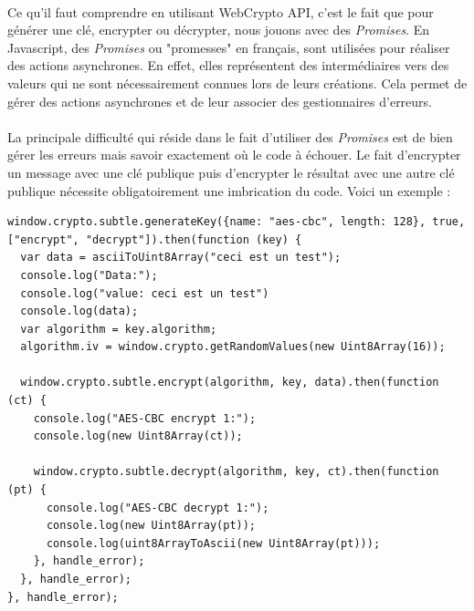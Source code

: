 \documentclass[a4paper,12pt]{report}
\begin{document}
	\paragraph*{}
	Ce qu'il faut comprendre en utilisant WebCrypto API, c'est le fait que pour générer une clé, encrypter ou décrypter, nous jouons avec des \textit{Promises}. En Javascript, des \textit{Promises} ou "promesses" en français, sont utilisées pour réaliser des actions asynchrones. En effet, elles représentent des intermédiaires vers des valeurs qui ne sont nécessairement connues lors de leurs créations. Cela permet de gérer des actions asynchrones et de leur associer des gestionnaires d'erreurs. 
	\paragraph*{}
	La principale difficulté qui réside dans le fait d'utiliser des \textit{Promises} est de bien gérer les erreurs mais savoir exactement où le code à échouer. Le fait d'encrypter un message avec une clé publique puis d'encrypter le résultat avec une autre clé publique nécessite obligatoirement une imbrication du code.
	Voici un exemple :
	\begin{lstlisting}
window.crypto.subtle.generateKey({name: "aes-cbc", length: 128}, true, ["encrypt", "decrypt"]).then(function (key) {
  var data = asciiToUint8Array("ceci est un test");
  console.log("Data:");
  console.log("value: ceci est un test")
  console.log(data);
  var algorithm = key.algorithm;
  algorithm.iv = window.crypto.getRandomValues(new Uint8Array(16));

  window.crypto.subtle.encrypt(algorithm, key, data).then(function (ct) {
    console.log("AES-CBC encrypt 1:");
    console.log(new Uint8Array(ct));

    window.crypto.subtle.decrypt(algorithm, key, ct).then(function (pt) {
      console.log("AES-CBC decrypt 1:");
      console.log(new Uint8Array(pt));
      console.log(uint8ArrayToAscii(new Uint8Array(pt)));
    }, handle_error);
  }, handle_error);
}, handle_error);
	\end{lstlisting}
\end{document}

